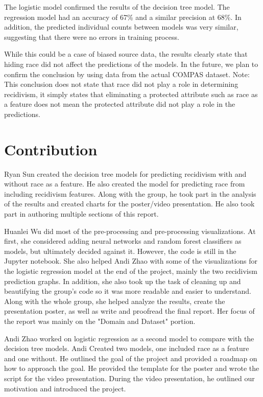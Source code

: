 \documentclass[11pt, sigconf]{acmart}
\begin{document}
The logistic model confirmed the results of the decision tree model. The regression model had an accuracy of 67\% and a similar precision at 68\%. In addition, the predicted individual counts between models was very similar, suggesting that there were no errors in training process. 

While this could be a case of biased source data, the results clearly state that hiding race did not affect the predictions of the models. In the future, we plan to confirm the conclusion by using data from  the actual COMPAS dataset. Note: This conclusion does not state that race did not play a role in determining recidivism, it simply states that eliminating a protected attribute such as race as a feature does not mean the protected attribute did not play a role in the predictions.

\section{Contribution}

\hspace{5mm}Ryan Sun created the decision tree models for predicting recidivism with and without race as a feature. He also created the model for predicting race from including recidivism features. Along with the group, he took part in the analysis of the results and created charts for the poster/video presentation. He also took part in authoring multiple sections of this report. 

Huanlei Wu did most of the pre-processing and pre-processing visualizations. At first, she considered adding neural networks and random forest classifiers as models, but ultimately decided against it. However, the code is still in the Jupyter notebook. She also helped Andi Zhao with some of the visualizations for the logistic regression model at the end of the project, mainly the two recidivism prediction graphs. In addition, she also took up the task of cleaning up and beautifying the group's code so it was more readable and easier to understand. Along with the whole group, she helped analyze the results, create the presentation poster, as well as write and proofread the final report. Her focus of the report was mainly on the "Domain and Dataset" portion. 

Andi Zhao worked on logistic regression as a second model to compare with the decision tree models. Andi Created two models, one included race as a feature and one without. He outlined the goal of the project and provided a roadmap on how to approach the goal. He provided the template for the poster and wrote the script for the video presentation. During the video presentation, he outlined our motivation and introduced the project. 
\end{document}
